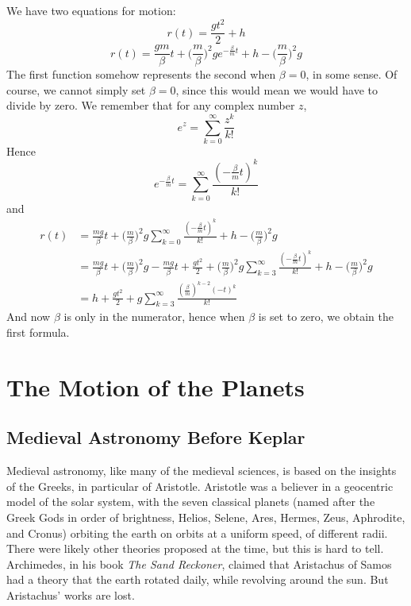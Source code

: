 We have two equations for motion:
%
\[ r(t) = \frac{gt^2}{2} + h \]
%
\[ r(t) = \frac{gm}{\beta} t + \big( \frac{m}{\beta} \big)^2 g e^{-\frac{\beta}{m}t} +  h - \big( \frac{m}{\beta} \big)^2 g \]
%
The first function somehow represents the second when $\beta = 0$, in some sense. Of course, we cannot simply set $\beta = 0$, since this would mean we would have to divide by zero. We remember that for any complex number $z$,
%
\[ e^z = \sum_{k = 0}^\infty \frac{z^k}{k!} \]
%
Hence
%
\[ e^{-\frac{\beta}{m}t} = \sum_{k = 0}^\infty \frac{(-\frac{\beta}{m}t)^k}{k!} \]
%
and
%
\begin{align*}
    r(t) &= \frac{mg}{\beta} t + \big( \frac{m}{\beta} \big)^2 g \sum_{k = 0}^\infty \frac{(-\frac{\beta}{m}t)^k}{k!} +  h - \big( \frac{m}{\beta} \big)^2 g\\
    &= \frac{mg}{\beta} t + \big( \frac{m}{\beta} \big)^2 g - \frac{mg}{\beta}t + \frac{gt^2}{2} + \big( \frac{m}{\beta} \big)^2 g \sum_{k = 3}^\infty \frac{(-\frac{\beta}{m}t)^k}{k!} +  h - \big( \frac{m}{\beta} \big)^2g\\
    &= h + \frac{gt^2}{2} + g \sum_{k = 3}^\infty \frac{(\frac{\beta}{m})^{k - 2} (-t)^k}{k!}
\end{align*}
%
And now $\beta$ is only in the numerator, hence when $\beta$ is set to zero, we obtain the first formula.




\chapter{The Motion of the Planets}

\section{Medieval Astronomy Before Keplar}

Medieval astronomy, like many of the medieval sciences, is based on the insights of the Greeks, in particular of Aristotle. Aristotle was a believer in a geocentric model of the solar system, with the seven classical planets (named after the Greek Gods in order of brightness, Helios, Selene, Ares, Hermes, Zeus, Aphrodite, and Cronus) orbiting the earth on orbits at a uniform speed, of different radii. There were likely other theories proposed at the time, but this is hard to tell. Archimedes, in his book \emph{The Sand Reckoner}, claimed that Aristachus of Samos had a theory that the earth rotated daily, while revolving around the sun. But Aristachus' works are lost.

